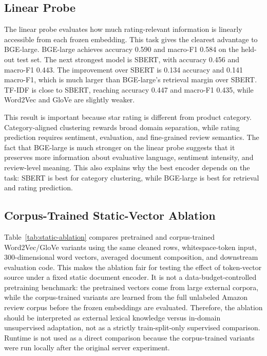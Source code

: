 \documentclass{article}
\begin{document}
\subsection{Linear Probe}

The linear probe evaluates how much rating-relevant information is linearly accessible from each frozen embedding. This task gives the clearest advantage to BGE-large. BGE-large achieves accuracy 0.590 and macro-F1 0.584 on the held-out test set. The next strongest model is SBERT, with accuracy 0.456 and macro-F1 0.443. The improvement over SBERT is 0.134 accuracy and 0.141 macro-F1, which is much larger than BGE-large's retrieval margin over SBERT. TF-IDF is close to SBERT, reaching accuracy 0.447 and macro-F1 0.435, while Word2Vec and GloVe are slightly weaker.

This result is important because star rating is different from product category. Category-aligned clustering rewards broad domain separation, while rating prediction requires sentiment, evaluation, and fine-grained review semantics. The fact that BGE-large is much stronger on the linear probe suggests that it preserves more information about evaluative language, sentiment intensity, and review-level meaning. This also explains why the best encoder depends on the task: SBERT is best for category clustering, while BGE-large is best for retrieval and rating prediction.

\subsection{Corpus-Trained Static-Vector Ablation}

Table~\ref{tab:static-ablation} compares pretrained and corpus-trained Word2Vec/GloVe variants using the same cleaned rows, whitespace-token input, 300-dimensional word vectors, averaged document composition, and downstream evaluation code. This makes the ablation fair for testing the effect of token-vector source under a fixed static document encoder. It is not a data-budget-controlled pretraining benchmark: the pretrained vectors come from large external corpora, while the corpus-trained variants are learned from the full unlabeled Amazon review corpus before the frozen embeddings are evaluated. Therefore, the ablation should be interpreted as external lexical knowledge versus in-domain unsupervised adaptation, not as a strictly train-split-only supervised comparison. Runtime is not used as a direct comparison because the corpus-trained variants were run locally after the original server experiment.
\end{document}
